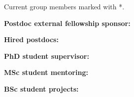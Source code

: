 Current group members marked with *.

\vspace{0.2cm}
\textbf{Postdoc external fellowship sponsor:}


\vspace{0.2cm}
\textbf{Hired postdocs:}


\vspace{0.2cm}
\textbf{PhD student supervisor:}


\vspace{0.2cm}
\textbf{MSc student mentoring:}


\vspace{0.2cm}
\textbf{BSc student projects:}

\vspace{-0.1cm}